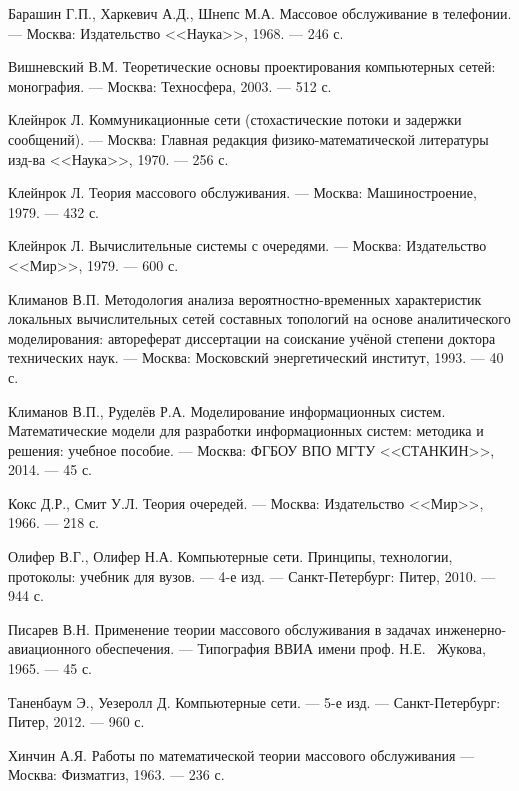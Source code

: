 \documentclass[oneside, draft, 14pt, a4paper]{extreport}
\begin{document}
\renewcommand{\bibname}{\centering Список литературы}
\begin{thebibliography}{00}

 Барашин Г.П., Харкевич А.Д., Шнепс М.А.
Массовое обслуживание в телефонии.
--- Москва: Издательство <<Наука>>, 1968.
--- 246 с.

 Вишневский В.М.
Теоретические основы проектирования компьютерных сетей: монография.
--- Москва: Техносфера, 2003.
--- 512 с.

 Клейнрок Л.
Коммуникационные сети (стохастические потоки и задержки сообщений).
--- Москва: Главная редакция физико-математической литературы изд-ва <<Наука>>, 1970.
--- 256 с.

 Клейнрок Л.
Теория массового обслуживания.
--- Москва: Машиностроение, 1979.
--- 432 с.

 Клейнрок Л.
Вычислительные системы с очередями.
--- Москва: Издательство <<Мир>>, 1979.
--- 600 с.

 Климанов В.П.
Методология анализа вероятностно-временных характеристик локальных вычислительных сетей составных топологий на основе аналитического
моделирования: автореферат диссертации на соискание учёной степени доктора технических наук.
--- Москва: Московский энергетический институт, 1993.
--- 40 с.

 Климанов В.П., Руделёв Р.А.
Моделирование информационных систем. Математические модели для разработки информационных систем: методика и решения: учебное пособие.
--- Москва: ФГБОУ ВПО МГТУ <<СТАНКИН>>, 2014.
--- 45 с.

 Кокс Д.Р., Смит У.Л.
Теория очередей.
--- Москва: Издательство <<Мир>>, 1966.
--- 218 с.

 Олифер В.Г., Олифер Н.А.
Компьютерные сети. Принципы, технологии, протоколы: учебник для вузов.
--- 4-е изд.
--- Санкт-Петербург: Питер, 2010.
--- 944 с.

 Писарев В.Н.
Применение теории массового обслуживания в задачах инженерно-авиационного обеспечения.
--- Типография ВВИА имени проф. Н.Е. ~Жукова, 1965.
--- 45 с.

 Таненбаум Э., Уезеролл Д.
Компьютерные сети.
--- 5-е изд.
--- Санкт-Петербург: Питер, 2012.
--- 960 с.

 Хинчин А.Я.
Работы по математической теории массового обслуживания
--- Москва: Физматгиз, 1963.
--- 236 с.

\end{thebibliography}
\end{document}
